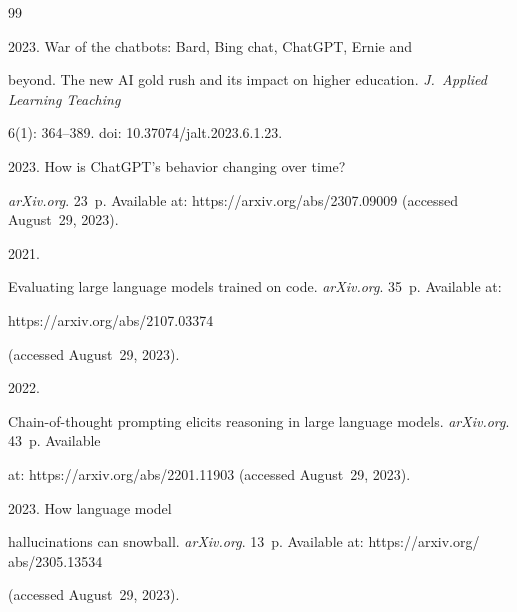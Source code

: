 {\small\frenchspacing


{ %




\begin{thebibliography}{99}




 2023. War of the chatbots: Bard, Bing chat, ChatGPT, Ernie and 


beyond. The new AI gold rush and its impact on higher education. \textit{J.~Applied Learning Teaching} 


6(1): 364--389. doi: 10.37074\!/\!jalt.2023.6.1.23.




 2023. How is ChatGPT's behavior changing over time? 


\textit{arXiv.org}. 23~p. Available at: {\sf https://arxiv.org/abs/2307.09009} (accessed August~29, 2023).




 2021. 


Evaluating large language models trained on code. \textit{arXiv.org}. 35~p. Available at: {\sf 


https://arxiv.org/abs/2107.03374} (accessed August~29, 2023).




 2022.  


Chain-of-thought prompting elicits reasoning in large language models. \textit{arXiv.org}. 43~p. Available 


at: {\sf https://arxiv.org/abs/2201.11903} (accessed August~29, 2023).




 2023. How language model 


hallucinations can snowball. \textit{arXiv.org}. 13~p. Available at: {\sf  https://arxiv.org/ abs/2305.13534} 


(accessed August~29, 2023).





\end{thebibliography}}}
